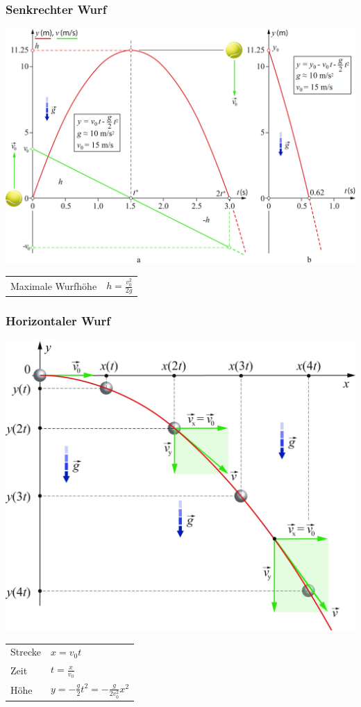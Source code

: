 \documentclass[a4paper]{scrartcl}
\begin{document}
\subsubsection{Senkrechter Wurf}
	\begin{multicols}{2}
		\includegraphics[width=\linewidth]{img/wurf_senkrecht}
		\begin{tabu} {l X}
			Maximale Wurfhöhe & $h = \frac{v^2_0}{2g}$
		\end{tabu}
	\end{multicols}

\subsubsection{Horizontaler Wurf}
	\begin{multicols}{2}
		\includegraphics[width=\linewidth]{img/wurf_horizontal}
		
		\begin{tabu} {l X}
			Strecke & $x = v_0 t$ \\
			Zeit & $t = \frac{x}{v_0}$ \\
			Höhe & $y = - \frac{g}{2}t^2 = - \frac{g}{2v^2_0} x^2$
		\end{tabu}
	\end{multicols}
\end{document}
